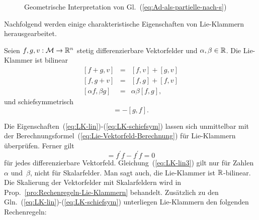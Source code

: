 \begin{figure}
\begin{centering}

\par\end{centering}
\caption{Geometrische Interpretation von Gl.~(\ref{eq:Ad-als-partielle-nach-s})\label{fig:Ad-partiell-s}}
\end{figure}

Nachfolgend werden einige charakteristische Eigenschaften von Lie-Klammern
herausgearbeitet.
\begin{proposition}
\label{prop:Eigenschaften-Lie-Klammer}Seien $f,g,v:\mathcal{M}\to{\mathbb{R}}^{n}$
stetig differenzierbare Vektorfelder und $\alpha,\beta\in{\mathbb{R}}$. Die
Lie-Klammer ist bilinear \begin{subequations}\label{eq:LK-lin} 
\begin{eqnarray}
[f+g,v] & = & [f,v]+[g,v]\label{eq:LK-lin1}\\
{}[f,g+v] & = & [f,g]+[f,v]\label{eq:LK-lin2}\\
{}[\alpha f,\beta g] & = & \alpha\beta[f,g],\label{eq:LK-lin3}
\end{eqnarray}
\end{subequations} und schiefsymmetrisch
\begin{equation}
[f,g]=-[g,f].\label{eq:LK-schiefsym}
\end{equation}
\end{proposition}
Die Eigenschaften~(\ref{eq:LK-lin})-(\ref{eq:LK-schiefsym}) lassen
sich unmittelbar mit der Berechnungsformel~(\ref{eq:Lie-Vektorfeld-Berechnung})
für Lie-Klammern überprüfen. Ferner gilt 
\begin{equation}
[f,f]=f^{\prime}f-f^{\prime}f=0\label{eq:LK-f-f-0}
\end{equation}
für jedes differenzierbare Vektorfeld. Gleichung~(\ref{eq:LK-lin3})
gilt nur für Zahlen~$\alpha$ und~$\beta$, nicht für Skalarfelder.
Man sagt auch, die Lie-Klammer ist ${\mathbb{R}}$-bilinear. Die Skalierung
der Vektorfelder mit Skalarfeldern wird in Prop.~\ref{pro:Rechenregeln-Lie-Klammern}
behandelt. Zusätzlich zu den Gln.~(\ref{eq:LK-lin})-(\ref{eq:LK-schiefsym})
unterliegen Lie-Klammern den folgenden Rechen\-regeln:

